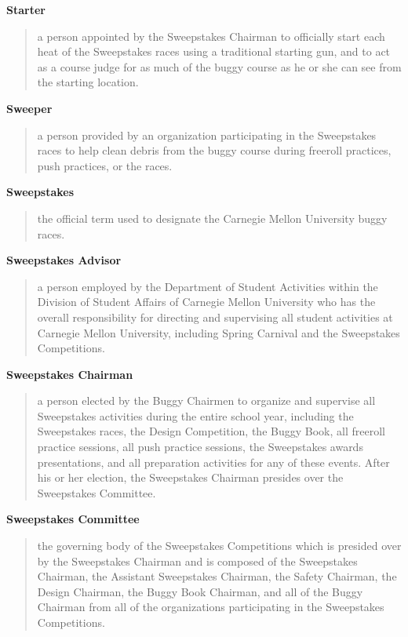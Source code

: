 \documentclass[openany]{book}
\begin{document}
\textbf{Starter}
\begin{quote}
	a person appointed by the Sweepstakes Chairman to officially start each heat of the Sweepstakes races using a traditional starting gun, and to act as a course judge for as much of the buggy course as he or she can see from the starting location.
\end{quote}

\textbf{Sweeper}
\begin{quote}
	a person provided by an organization participating in the Sweepstakes races to help clean debris from the buggy course during freeroll practices, push practices, or the races.
\end{quote}

\textbf{Sweepstakes}
\begin{quote}
	the official term used to designate the Carnegie Mellon University buggy races.
\end{quote}

\textbf{Sweepstakes Advisor}
\begin{quote}
	a person employed by the Department of Student Activities within the Division of Student Affairs of Carnegie Mellon University who has the overall responsibility for directing and supervising all student activities at Carnegie Mellon University, including Spring Carnival and the Sweepstakes Competitions.
\end{quote}

\textbf{Sweepstakes Chairman}
\begin{quote}
	a person elected by the Buggy Chairmen to organize and supervise all Sweepstakes activities during the entire school year, including the Sweepstakes races, the Design Competition, the Buggy Book, all freeroll practice sessions, all push practice sessions, the Sweepstakes awards presentations, and all preparation activities for any of these events. After his or her election, the Sweepstakes Chairman presides over the Sweepstakes Committee.
\end{quote}

\textbf{Sweepstakes Committee}
\begin{quote}
	the governing body of the Sweepstakes Competitions which is presided over by the Sweepstakes Chairman and is composed of the Sweepstakes Chairman, the Assistant Sweepstakes Chairman, the Safety Chairman, the Design Chairman, the Buggy Book Chairman, and all of the Buggy Chairman from all of the organizations participating in the Sweepstakes Competitions.
\end{quote}
\end{document}
